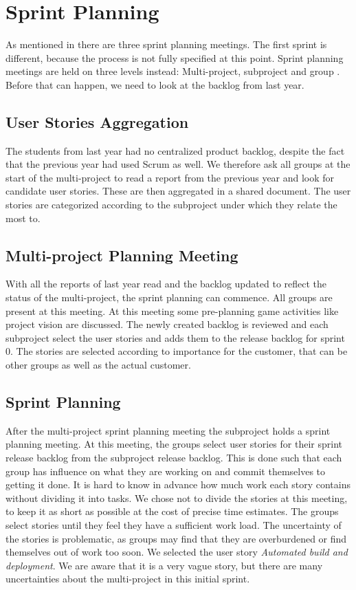 \chapter{Sprint Planning}\label{chap:sprint1_planning}
As mentioned in  there are three sprint planning meetings. The first sprint is different, because the process is not fully specified at this point. Sprint planning meetings are held on three levels instead: Multi-project, subproject and group . Before that can happen, we need to look at the backlog from last year.

\section{User Stories Aggregation}

The students from last year had no centralized product backlog, despite the fact that the previous year had used Scrum as well. We therefore ask all groups at the start of the multi-project to read a report from the previous year and look for candidate user stories. These are then aggregated in a shared document. The user stories are categorized according to the subproject under which they relate the most to.

\section{Multi-project Planning Meeting}
With all the reports of last year read and the backlog updated to reflect the status of the multi-project, the sprint planning can commence. All groups are present at this meeting. At this meeting some pre-planning game activities like project vision are discussed. The newly created backlog is reviewed and each subproject select the user stories and adds them to the release backlog for sprint 0. The stories are selected according to importance for the customer, that can be other groups as well as the actual customer.

\section{\bd Sprint Planning}
After the multi-project sprint planning meeting the \bd subproject holds a sprint planning meeting. At this meeting, the groups select user stories for their sprint release backlog from the \bd subproject release backlog. This is done such that each group has influence on what they are working on and commit themselves to getting it done. It is hard to know in advance how much work each story contains without dividing it into tasks. We chose not to divide the stories at this meeting, to keep it as short as possible at the cost of precise time estimates. The groups select stories until they feel they have a sufficient work load. The uncertainty of the stories is problematic, as groups may find that they are overburdened or find themselves out of work too soon. We selected the user story \emph{Automated build and deployment}. We are aware that it is a very vague story, but there are many uncertainties about the multi-project in this initial sprint.

